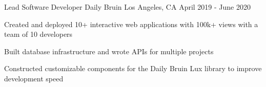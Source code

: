 \documentclass[12pt, letterpaper]{awesome-cv}
\begin{document}
\begin{cventries}

  \cventry
    {Lead Sof\/tware Developer} %
    {Daily Bruin} %
    {Los Angeles, CA} %
    {April 2019 - June 2020} %
    {
      \begin{cvitems} %
        \item {Created and deployed 10+ interactive web applications with 100k+ views with a team of 10 developers}
        \item {Built database infrastructure and wrote APIs for multiple projects}
		    \item {Constructed customizable components for the Daily Bruin Lux library to improve development speed}
      \end{cvitems}
    }

\end{cventries}
\end{document}
